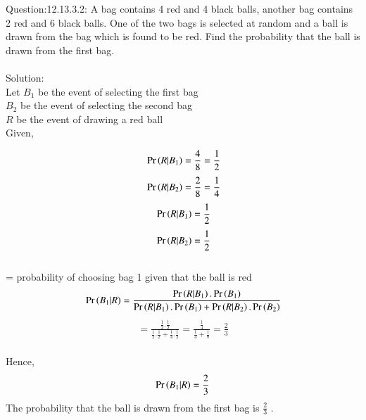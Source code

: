 \documentclass[journal,12pt,twocolumn]{IEEEtran}
\begin{document}
\maketitle
\newpage
\bigskip
Question:12.13.3.2: A bag contains 4 red and 4 black balls, another bag contains 2 red and 6 black balls. One of the two bags is selected at random and a ball is drawn from the bag which is found to be red. Find the probability that the ball is drawn from the first bag.
\\
\\
Solution:
\\Let $B_1$ be the event of selecting the first bag
\\$B_2$ be the event of selecting the second bag
\\$R$ be the event of drawing a red ball
\\Given,

$$ \\ \Pr\left(R|B_1\right)=\frac{4}{8}=\frac{1}{2} $$
$$ \\ \Pr\left(R|B_2\right)=\frac{2}{8}=\frac{1}{4} $$
$$ \\ \Pr\left(R|B_1\right)=\frac{1}{2} $$
$$ \\ \Pr\left(R|B_2\right)=\frac{1}{2} $$
\\ = probability of choosing bag 1 given that the ball is red 
$$ \\ \Pr\left(B_1|R\right)=\frac{\Pr\left(R|B_1\right).\Pr\left(B_1\right)}{\Pr\left(R|B_1\right).\Pr\left(B_1\right)+\Pr\left(R|B_2\right).\Pr\left(B_2\right)} $$
\begin{align}
=\frac{\frac{1}{2}.\frac{1}{2}}{\frac{1}{2}.\frac{1}{2}+\frac{1}{4}.\frac{1}{2}}
=\frac{\frac{1}{4}}{\frac{1}{4}+\frac{1}{8}}
=\frac{2}{3}
\end{align}
\\Hence, $$ \Pr\left(B_1|R\right)=\frac{2}{3}$$
The probability that the ball is drawn from the first bag is $\frac{2}{3}$ .
\end{document}
